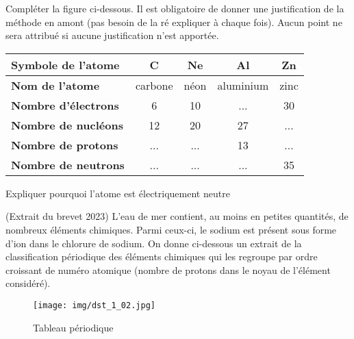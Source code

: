 \documentclass{exam}
\begin{document}
\begin{questions}
  \question[2] Compléter la figure ci-dessous. Il est obligatoire de donner une justification de la méthode en amont (pas besoin de la ré expliquer à chaque fois). Aucun point ne sera attribué si aucune justification n'est apportée.

\begin{table}[H]
  \centering
  \begin{tabularx}{\textwidth}{|X|C|C|C|C|}
    \hline
    \textbf{Symbole de l’atome} & \textbf{C} & \textbf{Ne} & \textbf{Al} & \textbf{Zn} \\
    \hline
    \textbf{Nom de l’atome} & carbone & néon & aluminium & zinc \\
    \hline
    \textbf{Nombre d’électrons} & 6 & 10 & ... & 30 \\
    \hline
    \textbf{Nombre de nucléons} & 12 & 20 & 27 & ... \\
    \hline
    \textbf{Nombre de protons} & ... & ... & 13 & ... \\
    \hline
    \textbf{Nombre de neutrons} & ... & ... & ... & 35 \\
    \hline
  \end{tabularx}
\end{table}

\question[1]  Expliquer pourquoi l'atome est électriquement neutre

\question[2] (Extrait du brevet 2023) L'eau de mer contient, au moins en petites quantités, de nombreux éléments chimiques. Parmi ceux-ci, le sodium est présent sous forme d’ion dans le chlorure de sodium. On
donne ci-dessous un extrait de la classification périodique des éléments chimiques qui les
regroupe par ordre croissant de numéro atomique (nombre de protons dans le noyau de
l’élément considéré).

\begin{figure}[H]
  \centering
  \texttt{[image: img/dst\_1\_02.jpg]}
  \caption{Tableau périodique}
\end{figure} 


\end{questions}
\end{document}
